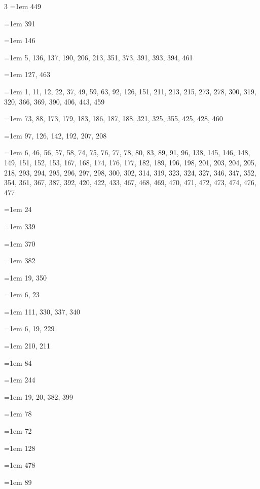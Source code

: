 \begin{multicols}{3}
\hangindent=1em  449\par
\hangindent=1em  391\par
\hangindent=1em  146\par
\hangindent=1em  5, 136, 137, 190, 206, 213, 351, 373, 391, 393, 394, 461\par
\hangindent=1em  127, 463\par
\hangindent=1em  1, 11, 12, 22, 37, 49, 59, 63, 92, 126, 151, 211, 213, 215, 273, 278, 300, 319, 320, 366, 369, 390, 406, 443, 459\par
\hangindent=1em  73, 88, 173, 179, 183, 186, 187, 188, 321, 325, 355, 425, 428, 460\par
\hangindent=1em  97, 126, 142, 192, 207, 208\par
\hangindent=1em  6, 46, 56, 57, 58, 74, 75, 76, 77, 78, 80, 83, 89, 91, 96, 138, 145, 146, 148, 149, 151, 152, 153, 167, 168, 174, 176, 177, 182, 189, 196, 198, 201, 203, 204, 205, 218, 293, 294, 295, 296, 297, 298, 300, 302, 314, 319, 323, 324, 327, 346, 347, 352, 354, 361, 367, 387, 392, 420, 422, 433, 467, 468, 469, 470, 471, 472, 473, 474, 476, 477\par
\hangindent=1em  24\par
\hangindent=1em  339\par
\hangindent=1em  370\par
\hangindent=1em  382\par
\hangindent=1em  19, 350\par
\hangindent=1em  6, 23\par
\hangindent=1em  111, 330, 337, 340\par
\hangindent=1em  6, 19, 229\par
\hangindent=1em  210, 211\par
\hangindent=1em  84\par
\hangindent=1em  244\par
\hangindent=1em  19, 20, 382, 399\par
\hangindent=1em  78\par
\hangindent=1em  72\par
\hangindent=1em  128\par
\hangindent=1em  478\par
\hangindent=1em  89\par

\end{multicols}
